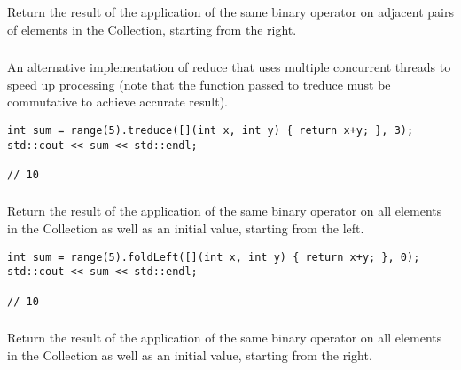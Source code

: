 Return the result of the application of the same binary operator on adjacent pairs of elements in the Collection, starting from the right.





\subsubsection{}

An alternative implementation of reduce that uses multiple concurrent threads to speed up processing
(note that the function passed to treduce must be commutative to achieve accurate result).

\begin{lstlisting}[title=example]
int sum = range(5).treduce([](int x, int y) { return x+y; }, 3);
std::cout << sum << std::endl;

// 10
\end{lstlisting}




\subsubsection{}

Return the result of the application of the same binary operator on all elements in the Collection as well as an initial value, starting from the left.

\begin{lstlisting}[title=example]
int sum = range(5).foldLeft([](int x, int y) { return x+y; }, 0);
std::cout << sum << std::endl;

// 10
\end{lstlisting}




\subsubsection{}

Return the result of the application of the same binary operator on all elements in the Collection as well as an initial value, starting from the right.




\subsubsection{}

